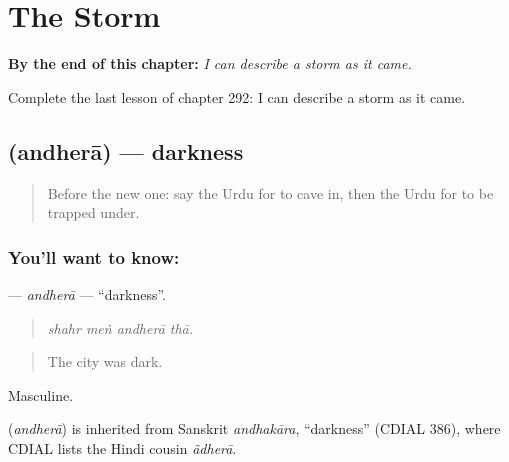 
\chapter{The Storm}
\label{ch:ur-the-storm}

\begin{chapteropening}
\textbf{By the end of this chapter:} \emph{I can describe a storm as it came.}

Complete the last lesson of chapter 292: I can describe a storm as it came.
\end{chapteropening}

\section[\texorpdfstring{\ur{اندھیرا} (andherā)}{اندھیرا (andherā)}]{ (andherā) — darkness}

\label{lesson:UR-C292-andhera}



\begin{quote}
Before the new one: say the Urdu for to cave in, then the Urdu for to be trapped under.
\end{quote}

\subsection*{You'll want to know: }
\textbf{} — \emph{andherā} — \textquotedblleft{}darkness\textquotedblright{}.

\begin{quote}
   
\end{quote}

\begin{quote}
\emph{shahr meṅ andherā thā.}
\end{quote}

\begin{quote}
The city was dark.
\end{quote}

Masculine.

\begin{cousinweb}
\textbf{} (\emph{andherā}) is inherited from Sanskrit \emph{andhakāra}, \textquotedblleft{}darkness\textquotedblright{} (CDIAL 386), where CDIAL lists the Hindi cousin \emph{ãdherā}.
\end{cousinweb}

